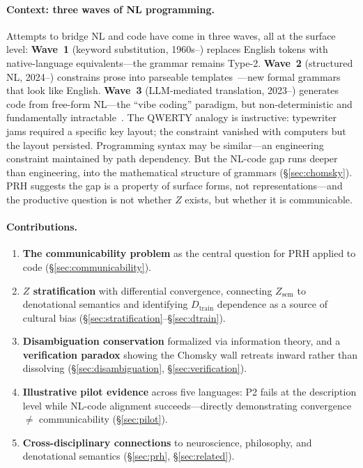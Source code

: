 \documentclass[11pt]{article}
\theoremstyle{definition}
\newcommand{\Zsem}{Z_{\text{sem}}}
\newcommand{\Dtrain}{D_{\text{train}}}
\begin{document}
\paragraph{Context: three waves of NL programming.} Attempts to bridge NL and code have come in three waves, all at the surface level: \textbf{Wave~1} (keyword substitution, 1960s--) replaces English tokens with native-language equivalents---the grammar remains Type-2. \textbf{Wave~2} (structured NL, 2024--) constrains prose into parseable templates~\cite{core2025,elliott2023sudolang}---new formal grammars that look like English. \textbf{Wave~3} (LLM-mediated translation, 2023--) generates code from free-form NL---the ``vibe coding'' paradigm, but non-deterministic and fundamentally intractable~\cite{icse2026reproducibility}. The QWERTY analogy is instructive: typewriter jams required a specific key layout; the constraint vanished with computers but the layout persisted. Programming syntax may be similar---an engineering constraint maintained by path dependency. But the NL-code gap runs deeper than engineering, into the mathematical structure of grammars (\S\ref{sec:chomsky}). PRH suggests the gap is a property of surface forms, not representations---and the productive question is not whether $Z$ exists, but whether it is communicable.

\paragraph{Contributions.}
\begin{enumerate}[label=(\arabic*),nosep]
  \item \textbf{The communicability problem} as the central question for PRH applied to code (\S\ref{sec:communicability}).
  \item \textbf{$Z$ stratification} with differential convergence, connecting $\Zsem$ to denotational semantics and identifying $\Dtrain$ dependence as a source of cultural bias (\S\ref{sec:stratification}--\S\ref{sec:dtrain}).
  \item \textbf{Disambiguation conservation} formalized via information theory, and a \textbf{verification paradox} showing the Chomsky wall retreats inward rather than dissolving (\S\ref{sec:disambiguation}, \S\ref{sec:verification}).
  \item \textbf{Illustrative pilot evidence} across five languages: P2 fails at the description level while NL-code alignment succeeds---directly demonstrating convergence $\neq$ communicability (\S\ref{sec:pilot}).
  \item \textbf{Cross-disciplinary connections} to neuroscience, philosophy, and denotational semantics (\S\ref{sec:prh}, \S\ref{sec:related}).
\end{enumerate}
\end{document}
